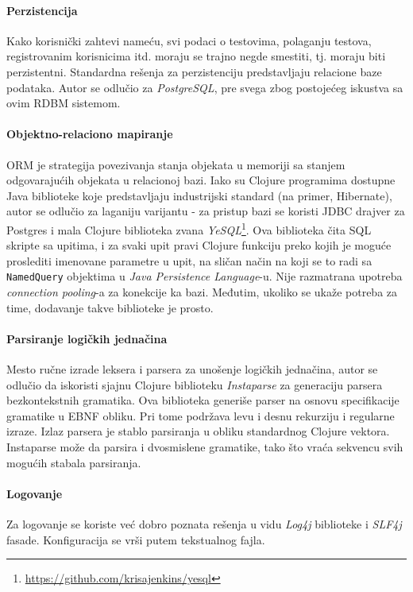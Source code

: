 \paragraph{Perzistencija}
Kako korisnički zahtevi nameću, svi podaci o testovima, polaganju testova, registrovanim korisnicima itd. moraju se trajno negde smestiti, tj. moraju biti perzistentni. Standardna rešenja za perzistenciju predstavljaju relacione baze podataka. Autor se odlučio za \emph{PostgreSQL}\cite{postgres}, pre svega zbog postojećeg iskustva sa ovim RDBM sistemom.

\paragraph{Objektno-relaciono mapiranje}
ORM je strategija povezivanja stanja objekata u memoriji sa stanjem odgovarajućih objekata u relacionoj bazi. Iako su Clojure programima dostupne Java biblioteke koje predstavljaju industrijski standard (na primer, Hibernate), autor se odlučio za laganiju varijantu - za pristup bazi se koristi JDBC drajver za Postgres i mala Clojure biblioteka zvana \emph{YeSQL}\footnote{\url{https://github.com/krisajenkins/yesql}}. Ova biblioteka čita SQL skripte sa upitima, i za svaki upit pravi Clojure funkciju preko kojih je moguće proslediti imenovane parametre u upit, na sličan način na koji se to radi sa \texttt{NamedQuery} objektima u \textit{Java Persistence Language}-u. Nije razmatrana upotreba \textit{connection pooling}-a za konekcije ka bazi. Međutim, ukoliko se ukaže potreba za time, dodavanje takve biblioteke je prosto.

\paragraph{Parsiranje logičkih jednačina} Mesto ručne izrade leksera i parsera za unošenje logičkih jednačina, autor se odlučio da iskoristi sjajnu Clojure biblioteku \emph{Instaparse}\cite{instaparse} za generaciju parsera bezkontekstnih gramatika. Ova biblioteka generiše parser na osnovu specifikacije gramatike u EBNF obliku. Pri tome podržava levu i desnu rekurziju i regularne izraze. Izlaz parsera je stablo parsiranja u obliku standardnog Clojure vektora. Instaparse može da parsira i dvosmislene gramatike, tako što vraća sekvencu svih mogućih stabala parsiranja.

\paragraph{Logovanje} Za logovanje se koriste već dobro poznata rešenja u vidu \emph{Log4j} biblioteke i \emph{SLF4j} fasade. Konfiguracija se vrši putem tekstualnog fajla.

